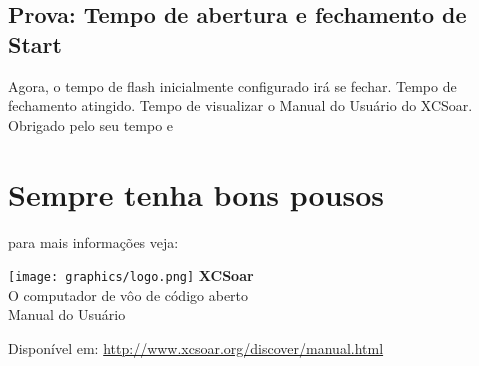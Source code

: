 \documentclass[a4paper,12pt,utf8]{scrreprt}
\begin{document}
\subsection*{\textcolor{flashblue}{Prova: Tempo de abertura e fechamento de Start}}
Agora, o tempo de flash inicialmente configurado irá se fechar.  Tempo de fechamento atingido.  Tempo de visualizar o Manual do Usuário do XCSoar. 
Obrigado pelo seu tempo e


\section*{Sempre tenha bons pousos}%

\normalsize
\tableofcontents


\newpage
\pagestyle{empty}

\normalsize{para mais informações veja:\\}
\vspace{0.5em}

\begin{center}
    \texttt{[image: graphics/logo.png]}
    \vskip 0.5cm
    \fontsize{50}{0}
    \selectfont\textbf{XCSoar}\\
    \fontsize{12}{12}
    \vspace{0.2em}
    \LARGE{O computador de vôo de código aberto}\\
    \vspace{1.2em}
    \LARGE{Manual do Usuário}\\
    
\vspace{9em}

\end{center}
\begin{flushright}
\normalsize Disponível em: \url{http://www.xcsoar.org/discover/manual.html}\\
\end{flushright}
\end{document}
